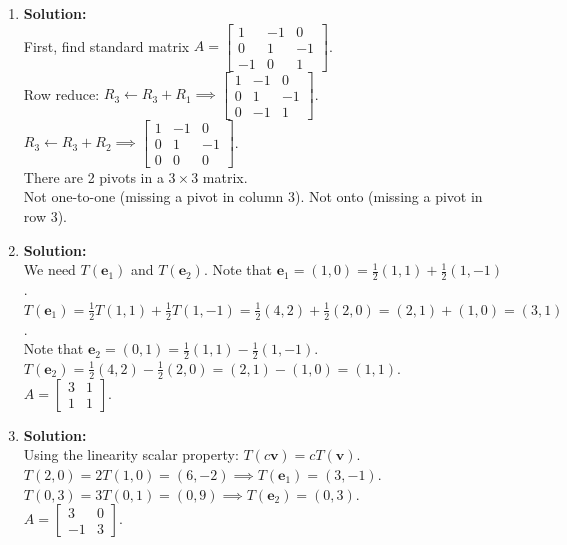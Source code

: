 \documentclass[12pt]{article}
\begin{document}
\begin{enumerate}
    \item \textbf{Solution:}\\
    First, find standard matrix $A = \begin{bmatrix} 1 & -1 & 0 \\ 0 & 1 & -1 \\ -1 & 0 & 1 \end{bmatrix}$. \\
    Row reduce: $R_3 \leftarrow R_3 + R_1 \implies \begin{bmatrix} 1 & -1 & 0 \\ 0 & 1 & -1 \\ 0 & -1 & 1 \end{bmatrix}$. \\
    $R_3 \leftarrow R_3 + R_2 \implies \begin{bmatrix} 1 & -1 & 0 \\ 0 & 1 & -1 \\ 0 & 0 & 0 \end{bmatrix}$. \\
    There are 2 pivots in a $3 \times 3$ matrix. \\
    Not one-to-one (missing a pivot in column 3). Not onto (missing a pivot in row 3).

    \item \textbf{Solution:}\\
    We need $T(\mathbf{e}_1)$ and $T(\mathbf{e}_2)$. Note that $\mathbf{e}_1 = (1, 0) = \frac{1}{2}(1, 1) + \frac{1}{2}(1, -1)$. \\
    $T(\mathbf{e}_1) = \frac{1}{2}T(1, 1) + \frac{1}{2}T(1, -1) = \frac{1}{2}(4, 2) + \frac{1}{2}(2, 0) = (2, 1) + (1, 0) = (3, 1)$. \\
    Note that $\mathbf{e}_2 = (0, 1) = \frac{1}{2}(1, 1) - \frac{1}{2}(1, -1)$. \\
    $T(\mathbf{e}_2) = \frac{1}{2}(4, 2) - \frac{1}{2}(2, 0) = (2, 1) - (1, 0) = (1, 1)$. \\
    $A = \begin{bmatrix} 3 & 1 \\ 1 & 1 \end{bmatrix}$.

    \item \textbf{Solution:}\\
    Using the linearity scalar property: $T(c\mathbf{v}) = cT(\mathbf{v})$. \\
    $T(2, 0) = 2T(1, 0) = (6, -2) \implies T(\mathbf{e}_1) = (3, -1)$. \\
    $T(0, 3) = 3T(0, 1) = (0, 9) \implies T(\mathbf{e}_2) = (0, 3)$. \\
    $A = \begin{bmatrix} 3 & 0 \\ -1 & 3 \end{bmatrix}$.


\end{enumerate}
\end{document}
